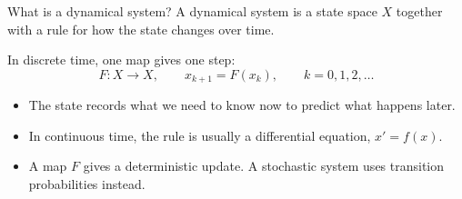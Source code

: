 \documentclass[10pt]{beamer}
\begin{document}
\begin{frame}{What is a dynamical system?}
A \alert{dynamical system} is a state space $X$ together with a rule for how the state changes over time.

\medskip
In \alert{discrete time}, one map gives one step:
\[
F:X\to X,\qquad x_{k+1}=F(x_k),\qquad k=0,1,2,\ldots
\]
\small
\begin{itemize}
\item The \alert{state} records what we need to know now to predict what happens later. %
\item In \alert{continuous time}, the rule is usually a differential equation, $x'=f(x)$.
\item A map $F$ gives a \alert{deterministic} update. A \alert{stochastic} system uses transition probabilities instead.
\end{itemize}

\end{frame}
\end{document}
